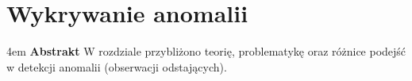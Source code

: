 \chapter{Wykrywanie anomalii}
\label{chap:OD}

\begingroup
\leftskip4em
\rightskip\leftskip
\noindent
\textbf{Abstrakt} W rozdziale przybliżono teorię, problematykę oraz różnice podejść w detekcji anomalii (obserwacji odstających).
\par
\endgroup



% 
% 
